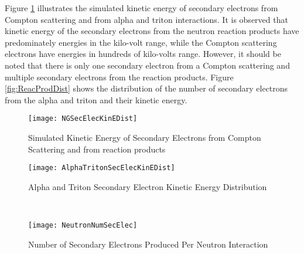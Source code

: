 Figure \ref{fig:simKinE} illustrates the simulated kinetic energy of secondary electrons from Compton scattering and from alpha and triton interactions.
It is observed that kinetic energy of the secondary electrons from the neutron reaction products have predominately energies in the kilo-volt range, while the Compton scattering electrons have energies in hundreds of kilo-volts range. 
However, it should be noted that there is only one secondary electron from a Compton scattering and multiple secondary electrons from the reaction products.
Figure \ref{fig:ReacProdDist} shows the distribution of the number of secondary electrons from the alpha and triton and their kinetic energy.
\begin{figure}[ht]
    \centering
    \texttt{[image: NGSecElecKinEDist]}
    \caption{Simulated Kinetic Energy of Secondary Electrons from Compton Scattering and from  reaction products}
    \label{fig:simKinE}
\end{figure}
\begin{figure*}[ht]
	\centering
	\begin{subfigure}[b]{0.45\textwidth}
    		\texttt{[image: AlphaTritonSecElecKinEDist]}
		\caption{Alpha and Triton Secondary Electron Kinetic Energy Distribution}
	\end{subfigure}%
	~
	\begin{subfigure}[b]{0.45\textwidth}
    		\texttt{[image: NeutronNumSecElec]}
		\caption{Number of Secondary Electrons Produced Per Neutron Interaction}
	\end{subfigure}%
	\caption{Neutron Reaction Products Secondary Electrons Energies}
	\label{fig:ReacProdDist}
\end{figure*}
